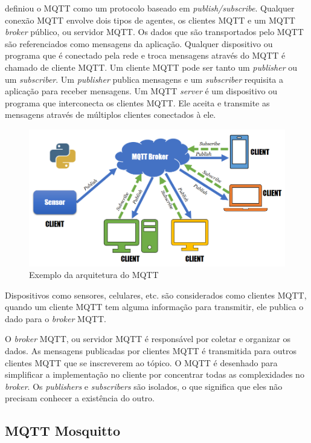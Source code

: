 \cite{Kodali2017} definiou o MQTT como um protocolo baseado em \textit {publish/subscribe}. Qualquer conexão MQTT envolve dois tipos de agentes, os clientes MQTT e um MQTT \textit {broker} público, ou servidor MQTT. Os dados que são transportados pelo MQTT são referenciados como mensagens da aplicação. Qualquer dispositivo ou programa que é conectado pela rede e troca mensagens através do MQTT é chamado de cliente MQTT. Um cliente MQTT pode ser tanto um \textit {publisher} ou um \textit {subscriber}. Um \textit {publisher} publica mensagens e um \textit {subscriber} requisita a aplicação para receber mensagens. Um MQTT \textit {server} é um dispositivo ou programa que interconecta os clientes MQTT. Ele aceita e transmite as mensagens através de múltiplos clientes conectados à ele.

\begin{figure}[htbp]
	\centering
	\includegraphics[width=1\linewidth]{figuras/mqtt-architecture.png}
	\caption{Exemplo da arquitetura do MQTT}
	\label{fig:arquitetura-mqtt}
\end{figure}

Dispositivos como sensores, celulares, etc. são considerados como clientes MQTT, quando um cliente MQTT tem alguma informação para transmitir, ele publica o dado para o \textit {broker} MQTT.

O \textit {broker} MQTT, ou servidor MQTT é responsável por coletar e organizar os dados. As mensagens publicadas por clientes MQTT é transmitida para outros clientes MQTT que se inscreverem ao tópico. O MQTT é desenhado para simplificar a implementação no cliente por concentrar todas as complexidades no \textit {broker}. Os \textit {publishers} e \textit {subscribers} são isolados, o que significa que eles não precisam conhecer a existência do outro.

\subsection{MQTT Mosquitto}

